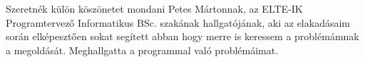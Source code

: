 \documentclass[
]{elteikthesis}[2022/04/30]
\begin{document}
Szeretnék külön köszönetet mondani Petes Mártonnak, az ELTE-IK Programtervező Informatikus BSc. szakának hallgatójának, aki az elakadásaim során elképesztően sokat segített abban hogy merre is keressem a problémámnak a megoldását. Meghallgatta a programmal való problémáimat. 

\printbibliography[title=\biblabel]
\cleardoublepage{}

{}
\listoffigures
\cleardoublepage

\listoftables
\cleardoublepage{}

\lstlistoflistings{}
\cleardoublepage{}

\end{document}
